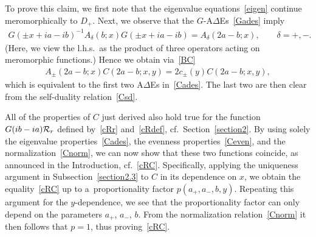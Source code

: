 \documentclass[11pt]{article}
\numberwithin{equation}{section}
\newcommand{\De}{\Delta}
\newcommand{\de}{\delta}
\newcommand{\cR}{{\cal R}}
\newcommand{\aaa}{a_{+},a_{-}}
\begin{document}
 To prove this claim, we f\/irst note that the eigenvalue equations~\eqref{eigen} continue meromorphically to $D_+$. Next, we observe that the $G$-A$\De$Es~\eqref{Gades} imply
\begin{gather}
G(\pm x +ia-ib)^{-1}A_{\de}(b;x)G(\pm x +ia-ib)=A_{\de}(2a-b;x),\qquad \de=+,-.
\end{gather}
(Here, we view the l.h.s.\ as the product of three operators acting on meromorphic functions.)
Hence we obtain via~\eqref{BC}
\begin{gather}
A_{\pm}(2a-b;x)C(2a-b;x,y)=2c_{\pm}(y)C(2a-b;x,y),
\end{gather}
which is equivalent to the f\/irst two A$\De$Es in~\eqref{Cades}. The last two are then clear from the self-duality relation~\eqref{Csd}.

All of the properties of $C$ just derived also hold true for the function $G(ib-ia)\cR_r$ def\/ined by~\eqref{cRr} and~\eqref{cRdef}, cf.~Section~\ref{section2}. By using solely the eigenvalue properties~\eqref{Cades}, the evenness properties~\eqref{Ceven}, and the normalization~\eqref{Cnorm}, we can now show that these two functions coincide, as announced in the Introduction, cf.~\eqref{cRC}. Specif\/ically, applying the uniqueness argument in Subsection~\ref{section2.3} to $C$ in its dependence on $x$, we obtain the equality~\eqref{cRC} up to a~proportionality factor $p(\aaa,b,y)$. Repeating this argument for the $y$-dependence, we see that the proportionality factor can only depend on the parameters $a_+$, $a_-$, $b$. From the normalization relation~\eqref{Cnorm} it then follows that $p=1$, thus proving~\eqref{cRC}.
\end{document}
